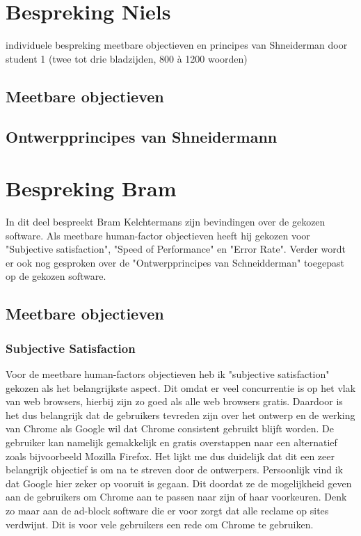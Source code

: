 \documentclass[11pt]{article}
\begin{document}
\section{Bespreking Niels}
individuele bespreking meetbare objectieven en principes van Shneiderman door student 1 (twee tot drie bladzijden, 800 à 1200 woorden)
\subsection{Meetbare objectieven}
\subsection{Ontwerpprincipes van Shneidermann}
\newpage

\section{Bespreking Bram}
In dit deel bespreekt Bram Kelchtermans zijn bevindingen over de gekozen software. Als meetbare human-factor objectieven heeft hij gekozen voor "Subjective satisfaction", "Speed of Performance" en "Error Rate". Verder wordt er ook nog gesproken over de "Ontwerpprincipes van Schneidderman" toegepast op de gekozen software.
\subsection{Meetbare objectieven}
\subsubsection{Subjective Satisfaction}
Voor de meetbare human-factors objectieven heb ik "subjective satisfaction" gekozen als het belangrijkste aspect. Dit omdat er veel concurrentie is op het vlak van web browsers, hierbij zijn zo goed als alle web browsers gratis. Daardoor is het dus belangrijk dat de gebruikers tevreden zijn over het ontwerp en de werking van Chrome als Google wil dat Chrome consistent gebruikt blijft worden. De gebruiker kan namelijk gemakkelijk en gratis overstappen naar een alternatief zoals bijvoorbeeld Mozilla Firefox. Het lijkt me dus duidelijk dat dit een zeer belangrijk objectief is om na te streven door de ontwerpers. Persoonlijk vind ik dat Google hier zeker op vooruit is gegaan. Dit doordat ze de mogelijkheid geven aan de gebruikers om Chrome aan te passen naar zijn of haar voorkeuren. Denk zo maar aan de ad-block software die er voor zorgt dat alle reclame op sites verdwijnt. Dit is voor vele gebruikers een rede om Chrome te gebruiken. 
\end{document}
